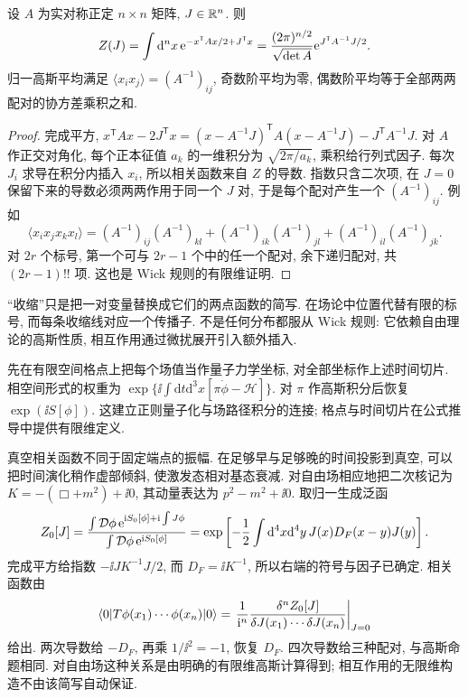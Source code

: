 \begin{proposition}\label{prop:gaussian-source}
设 $A$ 为实对称正定 $n\times n$ 矩阵, $J\in\mathbb R^n$. 则
\[
Z(J)=\int\mathrm d^nx\,\mathrm e^{-x^{\mathsf T}Ax/2+J^{\mathsf T}x}
=\frac{(2\pi)^{n/2}}{\sqrt{\det A}}\mathrm e^{J^{\mathsf T}A^{-1}J/2}.
\]
归一高斯平均满足 $\langle x_ix_j\rangle=(A^{-1})_{ij}$, 奇数阶平均为零, 偶数阶平均等于全部两两配对的协方差乘积之和.
\end{proposition}
\begin{proof}
完成平方, $x^{\mathsf T}Ax-2J^{\mathsf T}x=(x-A^{-1}J)^{\mathsf T}A(x-A^{-1}J)-J^{\mathsf T}A^{-1}J$. 对 $A$ 作正交对角化, 每个正本征值 $a_k$ 的一维积分为 $\sqrt{2\pi/a_k}$, 乘积给行列式因子. 每次 $J_i$ 求导在积分内插入 $x_i$, 所以相关函数来自 $Z$ 的导数. 指数只含二次项, 在 $J=0$ 保留下来的导数必须两两作用于同一个 $J$ 对, 于是每个配对产生一个 $(A^{-1})_{ij}$. 例如
\[
\langle x_ix_jx_kx_l\rangle
=(A^{-1})_{ij}(A^{-1})_{kl}+(A^{-1})_{ik}(A^{-1})_{jl}+(A^{-1})_{il}(A^{-1})_{jk}.
\]
对 $2r$ 个标号, 第一个可与 $2r-1$ 个中的任一个配对, 余下递归配对, 共 $(2r-1)!!$ 项. 这也是 Wick 规则的有限维证明.
\end{proof}
“收缩”只是把一对变量替换成它们的两点函数的简写. 在场论中位置代替有限的标号, 而每条收缩线对应一个传播子. 不是任何分布都服从 Wick 规则: 它依赖自由理论的高斯性质, 相互作用通过微扰展开引入额外插入.

先在有限空间格点上把每个场值当作量子力学坐标, 对全部坐标作上述时间切片. 相空间形式的权重为 $\exp\{\ii\int\mathrm dt\mathrm d^3x[\pi\dot\phi-\mathcal H]\}$. 对 $\pi$ 作高斯积分后恢复 $\exp(\ii S[\phi])$. 这建立正则量子化与场路径积分的连接; 格点与时间切片在公式推导中提供有限维定义.

真空相关函数不同于固定端点的振幅. 在足够早与足够晚的时间投影到真空, 可以把时间演化稍作虚部倾斜, 使激发态相对基态衰减. 对自由场相应地把二次核记为 $K=-(\Box+m^2)+\ii0$, 其动量表达为 $p^2-m^2+\ii0$. 取归一生成泛函
\begin{equation}\label{eq:Z0-source}
Z_0[J]=\frac{\int\mathcal D\phi\,\mathrm e^{\mathrm i S_0[\phi]+\mathrm i\int J\phi}}
{\int\mathcal D\phi\,\mathrm e^{\mathrm i S_0[\phi]}}
=\exp\left[-\frac12\int\mathrm d^4x\mathrm d^4y\,J(x)D_F(x-y)J(y)\right].
\end{equation}
完成平方给指数 $-\ii JK^{-1}J/2$, 而 $D_F=\ii K^{-1}$, 所以右端的符号与因子已确定. 相关函数由
\[
\langle 0\rvert T\phi(x_1)\cdots\phi(x_n)\lvert 0\rangle
=\left.\frac1{\mathrm i^n}\frac{\delta^nZ_0[J]}{\delta J(x_1)\cdots\delta J(x_n)}\right|_{J=0}
\]
给出. 两次导数给 $-D_F$, 再乘 $1/\ii^2=-1$, 恢复 $D_F$. 四次导数给三种配对, 与高斯命题相同. 对自由场这种关系是由明确的有限维高斯计算得到; 相互作用的无限维构造不由该简写自动保证.

